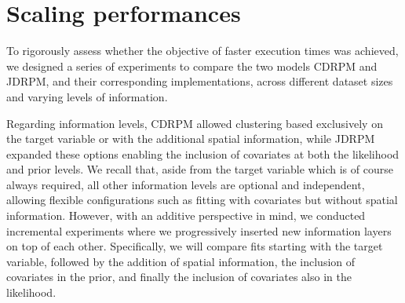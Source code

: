 \documentclass[12pt,	%
	a4paper,		%
	twoside,		%
	openright,		%
	titlepage,%
	]{book}
\theoremstyle{definition}
\begin{document}





\section{Scaling performances}
\label{chap: Scaling performances}

To rigorously assess whether the objective of faster execution times was achieved, we designed a series of experiments to compare the two models CDRPM and JDRPM, and their corresponding implementations, across different dataset sizes and varying levels of information.

Regarding information levels, CDRPM allowed clustering based exclusively on the target variable or with the additional spatial information, while JDRPM expanded these options enabling the inclusion of covariates at both the likelihood and prior levels. We recall that, aside from the target variable which is of course always required, all other information levels are optional and independent, allowing flexible configurations such as fitting with covariates but without spatial information. However, with an additive perspective in mind, we conducted incremental experiments where we progressively inserted new information layers on top of each other. Specifically, we will compare fits starting with the target variable, followed by the addition of spatial information, the inclusion of covariates in the prior, and finally the inclusion of covariates also in the likelihood.
\end{document}
